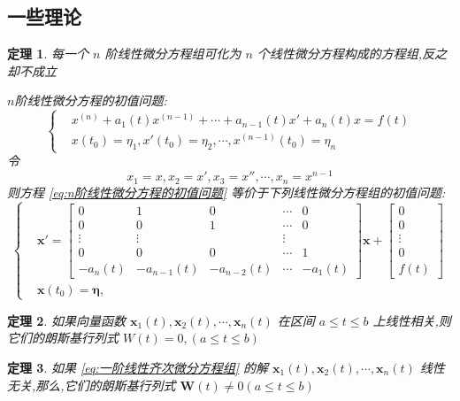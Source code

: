 \documentclass{ctexart}
\newtheorem{theorem}{定理}[section]
\numberwithin{equation}{subsection}
\begin{document}
\subsection{一些理论}
\begin{theorem}
        每一个 $n$ 阶线性微分方程组可化为 $n$ 个线性微分方程构成的方程组,反之却不成立

$n$阶线性微分方程的初值问题:
\begin{equation}
        \label{eq:n阶线性微分方程的初值问题}
        \left\{\begin{aligned}
                &x^{(n)}+a_1(t)x^{(n-1)}+\cdots+a_{n-1}(t)x'+a_n(t)x=f(t)\\
                &x(t_0)=\eta_1,x'(t_0)=\eta_2,\cdots,x^{(n-1)}(t_0)=\eta_n
        \end{aligned}\right.
\end{equation}
令 \[x_1=x,x_2=x',x_3=x'',\cdots,x_n=x^{n-1}\]
则方程 \eqref{eq:n阶线性微分方程的初值问题} 等价于下列线性微分方程组的初值问题:
\begin{equation}\left\{
        \begin{aligned}
                &\boldsymbol{x}'=\begin{bmatrix}
                        0 & 1 & 0 & \cdots &0 \\
                        0 & 0 & 1 & \cdots & 0\\
                        \vdots &\vdots  &  & \vdots & \\
                        0 & 0 & 0 & \cdots & 1\\
                        -a_n(t) & -a_{n-1}(t) & -a_{n-2}(t) & \cdots &
                       -a_1(t)\end{bmatrix}\boldsymbol{x}+\begin{bmatrix}
                        0\\
                        0\\
                        \vdots\\
                        0\\
                       f(t)
                       \end{bmatrix}\\
                &\boldsymbol{x}(t_0)=\boldsymbol{\eta},
        \end{aligned}
        \right.\end{equation}
\end{theorem}
\begin{theorem}
        如果向量函数 $\boldsymbol{x}_1(t),\boldsymbol{x}_2(t),\cdots,\boldsymbol{x}_n(t)$ 在区间 $a\leqslant t\leqslant b$ 上线性相关,则它们的朗斯基行列式 $W(t)=0,(a\leqslant t\leqslant b)$ 
\end{theorem}
\begin{theorem}
        如果 \eqref{eq:一阶线性齐次微分方程组} 的解 $\boldsymbol{x}_1(t),\boldsymbol{x}_2(t),\cdots,\boldsymbol{x}_n(t)$ 线性无关,那么,它们的朗斯基行列式 $\boldsymbol{W}(t)\ne 0(a\leqslant t\leqslant b)$
\end{theorem}
\end{document}
